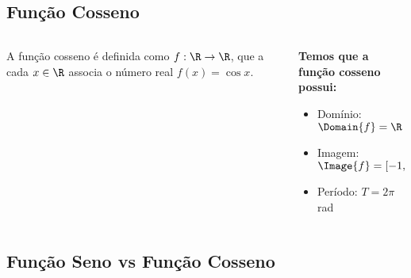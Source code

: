 \subsection{Função Cosseno}
\begin{frame}
  \begin{columns}[onlytextwidth]
    \begin{column}{0.49\textwidth}\vspace{-0.5cm}
      \begin{definition}
        A função cosseno é definida como $f:\R\rightarrow\R$, que a cada $x\in\R$ associa o número real $f(x)=\cos{x}$.
      \end{definition}
    \end{column}
    \begin{column}{0.49\textwidth}\vspace*{-0.5cm}
      \begin{highlight}
        \textbf{Temos que a função cosseno possui:}
        \begin{itemize}
          \item Domínio: $\Domain{f} = \R$
          \item Imagem: $\Image{f} = [-1,\,1]$
          \item Período: $T = 2\pi$ rad
        \end{itemize}
      \end{highlight}
    \end{column}
  \end{columns}
  \begin{figure}
  \end{figure}
\end{frame}

\begin{frame}[c]
  \begin{figure}
  \end{figure}
\end{frame}

\subsection{Função Seno vs Função Cosseno}
\begin{frame}[c]
  \begin{figure}
  \end{figure}
\end{frame}

